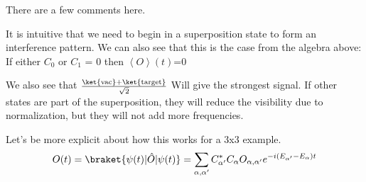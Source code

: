There are a few comments here.

It is intuitive that we need to begin in a superposition state to form an interference pattern.
We can also see that this is the case from the algebra above:  If either $C_0$ or $C_1$ = 0 then $\left< O \right>(t)$=0

We also see that $\frac{ \ket{\text{vac}} + \ket{\text{target}} }{\sqrt{2}}$ Will give the strongest signal.
If other states are part of the superposition, they will reduce the visibility due to normalization, but they will not add more frequencies.

Let's be more explicit about how this works for a 3x3 example.
\begin{equation*}
    \begin{aligned}
        O(t) =\braket{\psi(t)|\hat{O}|\psi(t)} = \sum_{\alpha, \alpha^{\prime}} C^{*}_{\alpha^{\prime}} C_{\alpha} O_{\alpha, \alpha^{\prime}} e^{- i (E_{\alpha^{\prime}} - E_{\alpha}) t}   \\[2.0ex]
    \end{aligned}
\end{equation*}

